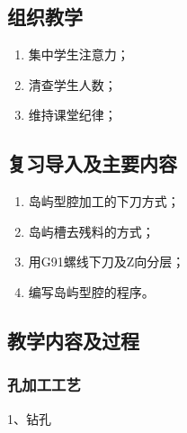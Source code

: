 \jxhj{%
	}

\makeshouye %

\subsection{组织教学}
\begin{enumerate}[\hspace{2em}1、]
	\item 集中学生注意力；
	\item 清查学生人数；
	\item 维持课堂纪律；
\end{enumerate}

\subsection{复习导入及主要内容}
\begin{enumerate}[1、]
\item 岛屿型腔加工的下刀方式；
\item 岛屿槽去残料的方式；
\item 用G91螺线下刀及Z向分层；
\item 编写岛屿型腔的程序。
\end{enumerate}

\subsection{教学内容及过程}
\subsubsection{孔加工工艺}
1、钻孔

